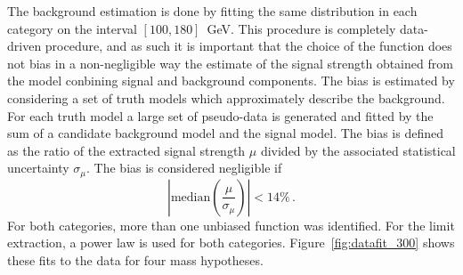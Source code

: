 The background estimation is done by fitting the same distribution in each category on the interval
$[100, 180]$~GeV. This procedure is completely data-driven procedure, and as such it is important
that the choice of the function does not bias in a non-negligible way the estimate of the signal
strength obtained from the model conbining signal and background components.
The bias is estimated by considering a set of truth models which approximately describe the background.
For each truth model a large set of pseudo-data is generated and fitted by the sum of a candidate
background model and the signal model. The bias is defined as the ratio of the extracted signal strength
$\mu$ divided by the associated statistical uncertainty $\sigma_\mu$.
The bias is considered negligible if
\begin{equation}
\left|\text{median}\left(\frac{\mu}{\sigma_\mu}\right)\right| < 14\% \,.
\end{equation}
For both categories, more than one unbiased function was identified. For the limit extraction,
a power law is used for both categories. Figure~\ref{fig:datafit_300} shows these fits to the
data for four mass hypotheses.

